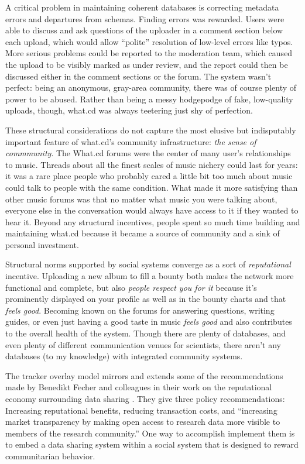 A critical problem in maintaining coherent databases is correcting
metadata errors and departures from schemas. Finding errors was
rewarded. Users were able to discuss and ask questions of the uploader
in a comment section below each upload, which would allow ``polite''
resolution of low-level errors like typos. More serious problems could
be reported to the moderation team, which caused the upload to be
visibly marked as under review, and the report could then be discussed
either in the comment sections or the forum. The system wasn't perfect:
being an anonymous, gray-area community, there was of course plenty of
power to be abused. Rather than being a messy hodgepodge of fake,
low-quality uploads, though, what.cd was always teetering just shy of
perfection.

These structural considerations do not capture the most elusive but
indisputably important feature of what.cd's community infrastructure:
\emph{the sense of commmunity}. The What.cd forums were the center of
many user's relationships to music. Threads about all the finest scales
of music nichery could last for years: it was a rare place people who
probably cared a little bit too much about music could talk to people
with the same condition. What made it more satisfying than other music
forums was that no matter what music you were talking about, everyone
else in the conversation would always have access to it if they wanted
to hear it. Beyond any structural incentives, people spent so much time
building and maintaining what.cd because it became a source of community
and a sink of personal investment.

Structural norms supported by social systems converge as a sort of
\emph{reputational} incentive. Uploading a new album to fill a bounty
both makes the network more functional and complete, but also
\emph{people respect you for it} because it's prominently displayed on
your profile as well as in the bounty charts and that \emph{feels good}.
Becoming known on the forums for answering questions, writing guides, or
even just having a good taste in music \emph{feels good} and also
contributes to the overall health of the system. Though there are plenty
of databases, and even plenty of different communication venues for
scientists, there aren't any databases (to my knowledge) with integrated
community systems.

The tracker overlay model mirrors and extends some of the
recommendations made by Benedikt Fecher and colleagues in their work on
the reputational economy surrounding data sharing \citep{fecherReputationEconomyHow2017} . They give three policy
recommendations: Increasing reputational benefits, reducing transaction
costs, and ``increasing market transparency by making open access to
research data more visible to members of the research community.'' One
way to accomplish implement them is to embed a data sharing system
within a social system that is designed to reward communitarian
behavior.

